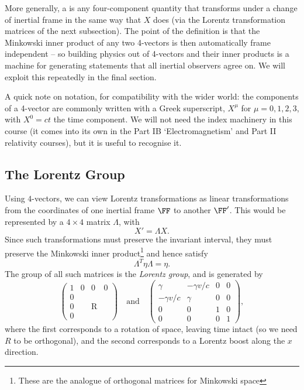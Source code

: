 More generally, a  is any four-component quantity that transforms under a change of inertial frame in the same way that $X$ does (via the Lorentz transformation matrices of the next subsection). The point of the definition is that the Minkowski inner product of any two 4-vectors is then automatically frame independent -- so building physics out of 4-vectors and their inner products is a machine for generating statements that all inertial observers agree on. We will exploit this repeatedly in the final section.

A quick note on notation, for compatibility with the wider world: the components of a 4-vector are commonly written with a Greek superscript, $X^\mu$ for $\mu = 0, 1, 2, 3$, with $X^0 = ct$ the time component. We will not need the index machinery in this course (it comes into its own in the Part IB `Electromagnetism' and Part II relativity courses), but it is useful to recognise it.

\subsection{The Lorentz Group}

Using $4$-vectors, we can view Lorentz transformations as linear transformations from the coordinates of one inertial frame $\FF$ to another $\FF'$. This would be represented by a $4 \times 4$ matrix $\Lambda$, with
$$
X' = \Lambda X.
$$
Since such transformations must preserve the invariant interval, they must preserve the Minkowski inner product\footnote{These are the analogue of orthogonal matrices for Minkowski space} and hence satisfy
$$
\Lambda^T \eta \Lambda = \eta.
$$
The group of all such matrices is the \emph{Lorentz group}, and is generated by 
$$
\left(\begin{array}{c|ccc}
	1 & 0 & 0 & 0 \\
	\hline 0 & & & \\
	0 & & \mathrm{R} & \\
	0 & & &
	\end{array}\right) 
	\quad \text{and} \quad \left(\begin{array}{cc|cc}
		\gamma & -\gamma v / c & 0 & 0 \\
		-\gamma v / c & \gamma & 0 & 0 \\
		\hline 0 & 0 & 1 & 0 \\
		0 & 0 & 0 & 1
		\end{array}\right),
$$
where the first corresponds to a rotation of space, leaving time intact (so we need $R$ to be orthogonal), and the second corresponds to a Lorentz boost along the $x$ direction.

